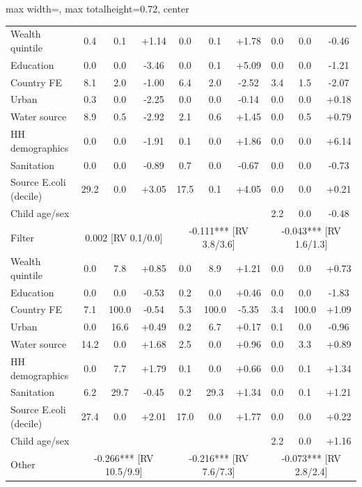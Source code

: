 \begin{landscape}
\begin{table}[htbp]
\begin{adjustbox}{max width=\linewidth, max totalheight=0.72\textwidth, center}
\begin{tabular}{l|ccc|ccc|ccc}
\quad Wealth quintile & 0.4 & 0.1 & +1.14 & 0.0 & 0.1 & +1.78 & 0.0 & 0.0 & -0.46 \\
\quad Education & 0.0 & 0.0 & -3.46 & 0.0 & 0.1 & +5.09 & 0.0 & 0.0 & -1.21 \\
\quad Country FE & 8.1 & 2.0 & -1.00 & 6.4 & 2.0 & -2.52 & 3.4 & 1.5 & -2.07 \\
\quad Urban & 0.3 & 0.0 & -2.25 & 0.0 & 0.0 & -0.14 & 0.0 & 0.0 & +0.18 \\
\quad Water source & 8.9 & 0.5 & -2.92 & 2.1 & 0.6 & +1.45 & 0.0 & 0.5 & +0.79 \\
\quad HH demographics & 0.0 & 0.0 & -1.91 & 0.1 & 0.0 & +1.86 & 0.0 & 0.0 & +6.14 \\
\quad Sanitation & 0.0 & 0.0 & -0.89 & 0.7 & 0.0 & -0.67 & 0.0 & 0.0 & -0.73 \\
\quad Source E.coli (decile) & 29.2 & 0.0 & +3.05 & 17.5 & 0.1 & +4.05 & 0.0 & 0.0 & +0.21 \\
\quad Child age/sex &  &  &  &  &  &  & 2.2 & 0.0 & -0.48 \\
\midrule
Filter & \multicolumn{3}{c|}{0.002 {\scriptsize[RV 0.1/0.0]}} & \multicolumn{3}{c|}{-0.111*** {\scriptsize[RV 3.8/3.6]}} & \multicolumn{3}{c}{-0.043*** {\scriptsize[RV 1.6/1.3]}} \\
\quad Wealth quintile & 0.0 & 7.8 & +0.85 & 0.0 & 8.9 & +1.21 & 0.0 & 0.0 & +0.73 \\
\quad Education & 0.0 & 0.0 & -0.53 & 0.2 & 0.0 & +0.46 & 0.0 & 0.0 & -1.83 \\
\quad Country FE & 7.1 & 100.0 & -0.54 & 5.3 & 100.0 & -5.35 & 3.4 & 100.0 & +1.09 \\
\quad Urban & 0.0 & 16.6 & +0.49 & 0.2 & 6.7 & +0.17 & 0.1 & 0.0 & -0.96 \\
\quad Water source & 14.2 & 0.0 & +1.68 & 2.5 & 0.0 & +0.96 & 0.0 & 3.3 & +0.89 \\
\quad HH demographics & 0.0 & 7.7 & +1.79 & 0.1 & 0.0 & +0.66 & 0.0 & 0.1 & +1.34 \\
\quad Sanitation & 6.2 & 29.7 & -0.45 & 0.2 & 29.3 & +1.34 & 0.0 & 0.1 & +1.21 \\
\quad Source E.coli (decile) & 27.4 & 0.0 & +2.01 & 17.0 & 0.0 & +1.77 & 0.0 & 0.0 & +0.22 \\
\quad Child age/sex &  &  &  &  &  &  & 2.2 & 0.0 & +1.16 \\
\midrule
Other & \multicolumn{3}{c|}{-0.266*** {\scriptsize[RV 10.5/9.9]}} & \multicolumn{3}{c|}{-0.216*** {\scriptsize[RV 7.6/7.3]}} & \multicolumn{3}{c}{-0.073*** {\scriptsize[RV 2.8/2.4]}} \\

\end{tabular}
\end{adjustbox}
\end{table}
\end{landscape}
